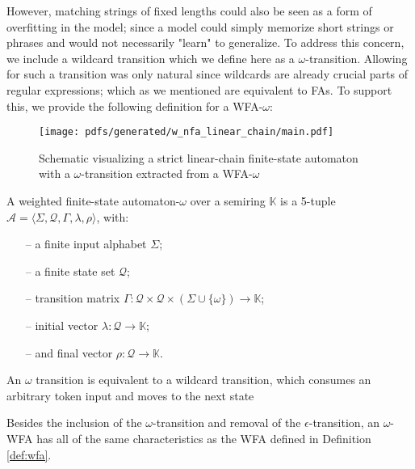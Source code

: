However, matching strings of fixed lengths could also be seen as a form of
overfitting in the model; since a model could simply memorize short strings or
phrases and would not necessarily "learn" to generalize. To address this
concern, we include a wildcard transition which we define here as a
$\omega$-transition. Allowing for such a transition was only natural since
wildcards are already crucial parts of regular expressions; which as we
mentioned are equivalent to FAs. To support this, we provide the following
definition for a WFA-$\omega$:

\begin{figure}[t]
  \centering
  \texttt{[image: pdfs/generated/w\_nfa\_linear\_chain/main.pdf]}
  \caption{Schematic visualizing a strict linear-chain finite-state automaton with
    a $\omega$-transition extracted from a WFA-$\omega$}
  \label{fig:omega_fa}
\end{figure}

\begin{definition}
  \label{def:wfa_w}
  A weighted finite-state automaton-$\omega$ over a semiring $\mathbb{K}$ is a
  5-tuple $\mathcal{A} = \langle \Sigma, \mathcal{Q}, \Gamma, \lambda, \rho
  \rangle$, with:

  \begin{itemize}
  \itemsep0em
    \item[--] a finite input alphabet $\Sigma$;
    \item[--] a finite state set $\mathcal{Q}$;
    \item[--] transition matrix $\Gamma: \mathcal{Q} \times \mathcal{Q} \times (\Sigma \cup \{\omega\}) \rightarrow \mathbb{K}$;
    \item[--] initial vector $\lambda: \mathcal{Q} \rightarrow \mathbb{K}$;
    \item[--] and final vector $\rho: \mathcal{Q} \rightarrow \mathbb{K}$.
  \end{itemize}

  \begin{remark}
    An $\omega$ transition is equivalent to a wildcard transition, which
    consumes an arbitrary token input and moves to the next state
  \end{remark}

  \begin{remark}
    Besides the inclusion of the $\omega$-transition and removal of the
    $\epsilon$-transition, an $\omega$-WFA has all of the same characteristics
    as the WFA defined in Definition \ref{def:wfa}.
  \end{remark}
\end{definition}

